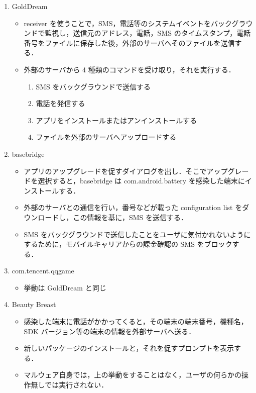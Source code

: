\begin{enumerate}
\item GoldDream
	\begin{itemize}
	\item	receiver を使うことで，SMS，電話等のシステムイベントをバックグラウンドで監視し，送信元のアドレス，電話，SMS のタイムスタンプ，電話番号をファイルに保存した後，外部のサーバへそのファイルを送信する．
	\item 外部のサーバから 4 種類のコマンドを受け取り，それを実行する．
	\begin{enumerate}
		\item SMS をバックグラウンドで送信する
		\item 電話を発信する
		\item アプリをインストールまたはアンインストールする
		\item ファイルを外部のサーバへアップロードする
	\end{enumerate}
	\end{itemize}

\item basebridge
	\begin{itemize}
	\item アプリのアップグレードを促すダイアログを出し．そこでアップグレードを選択すると，basebridge は com.android.battery を感染した端末にインストールする．
	\item 外部のサーバとの通信を行い，番号などが載った configuration list  をダウンロードし，この情報を基に，SMS を送信する．
	\item SMS をバックグラウンドで送信したことをユーザに気付かれないようにするために，モバイルキャリアからの課金確認の SMS をブロックする．
	\end{itemize}

\item com.tencent.qqgame
	\begin{itemize}
	\item 挙動は GoldDream と同じ
	\end{itemize}

\item Beauty Breast
	\begin{itemize}
	\item 感染した端末に電話がかかってくると，その端末の端末番号，機種名，SDK バージョン等の端末の情報を外部サーバへ送る．
	\item 新しいパッケージのインストールと，それを促すプロンプトを表示する．
	\item マルウェア自身では，上の挙動をすることはなく，ユーザの何らかの操作無しでは実行されない．
	\end{itemize}


\end{enumerate}
